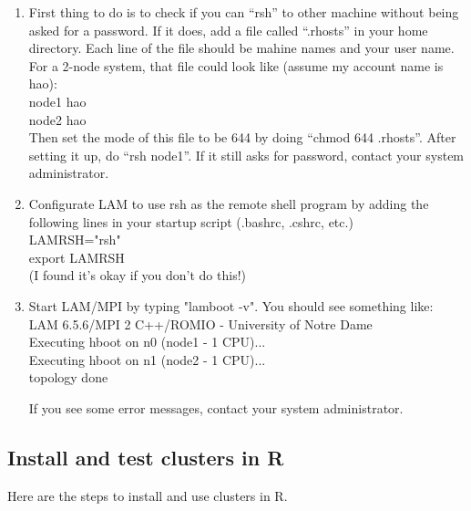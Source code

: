 \begin{enumerate}
\item First thing to do is to check if you can ``rsh'' to other machine
without being asked for a password. If it does, add a file called
``.rhosts'' in your home directory. Each line of the file should be
mahine names and your user name. For a 2-node system, that file could
look like (assume my account name is hao):\\
node1 hao\\
node2 hao\\
Then set the mode of this file to be 644 by doing ``chmod 644 .rhosts''.
After setting it up, do ``rsh node1''. If it still asks for password,
contact your system administrator.

\item Configurate LAM to use rsh as the remote shell program by adding
the following lines in your startup script (.bashrc, .cshrc, etc.)\\
LAMRSH="rsh"\\
export LAMRSH\\
(I found it's okay if you don't do this!)

\item Start LAM/MPI by typing "lamboot -v". You should see something
like:\\
LAM 6.5.6/MPI 2 C++/ROMIO - University of Notre Dame\\
Executing hboot on n0 (node1 - 1 CPU)...\\
Executing hboot on n1 (node2 - 1 CPU)...\\
topology done

If you see some error messages, contact your system administrator.

\end{enumerate}


% 
\subsection{Install and test clusters in R}
Here are the steps to install and use clusters in R.

